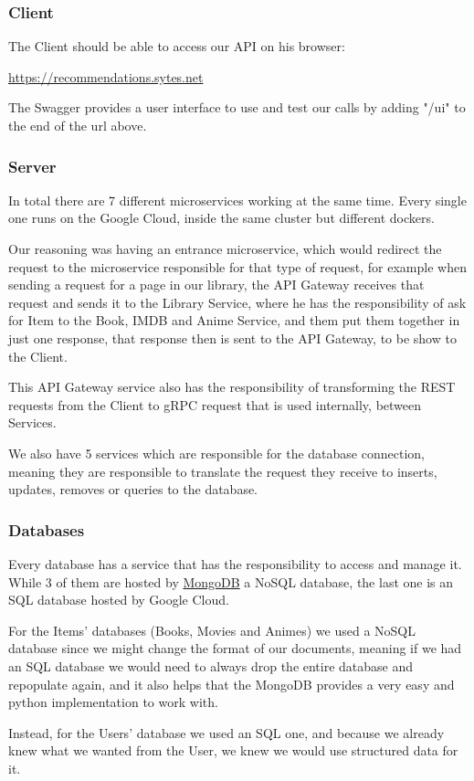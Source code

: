 \documentclass{article}
\newcommand*\fpar{\hspace{1ex}}
\begin{document}
    \subsubsection{Client}
    \fpar The Client should be able to access our API on his browser:
    \begin{center}
      \url{https://recommendations.sytes.net}
    \end{center}
    \par The Swagger provides a user interface to use and test our calls by adding "/ui" to the end of the url above.

    \subsubsection{Server}
    \fpar In total there are 7 different microservices working at the same time. Every single one runs on the Google Cloud, inside the same cluster but different dockers.
    \par Our reasoning was having an entrance microservice, which would redirect the request to the microservice responsible for that type of request, for example when sending a request for a page in our library, the API Gateway receives that request and sends it to the Library Service, where he has the responsibility of ask for Item to the Book, IMDB and Anime Service, and them put them together in just one response, that response then is sent to the API Gateway, to be show to the Client.
    \par This API Gateway service also has the responsibility of transforming the REST requests from the Client to gRPC request that is used internally, between Services.
    \par We also have 5 services which are responsible for the database connection, meaning they are responsible to translate the request they receive to inserts, updates, removes or queries to the database.

    \subsubsection{Databases}
    \fpar Every database has a service that has the responsibility to access and manage it. While 3 of them are hosted by \href{https://www.mongodb.com/}{MongoDB} a NoSQL database, the last one is an SQL database hosted by Google Cloud.
    \par For the Items' databases (Books, Movies and Animes) we used a NoSQL database since we might change the format of our documents, meaning if we had an SQL database we would need to always drop the entire database and repopulate again, and it also helps that the MongoDB provides a very easy and python implementation to work with.
    \par Instead, for the Users' database we used an SQL one, and because we already knew what we wanted from the User, we knew we would use structured data for it.
\end{document}
